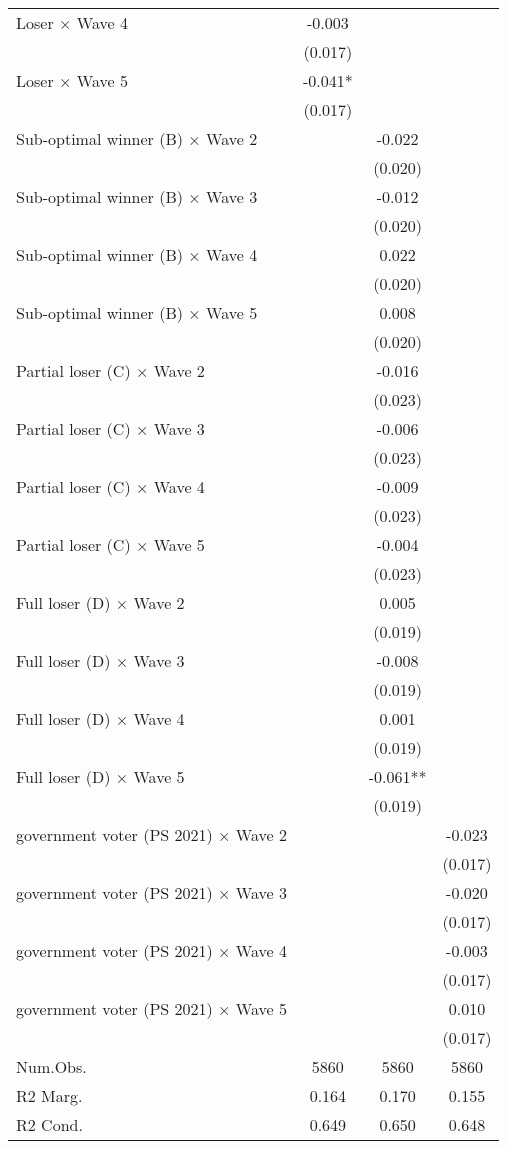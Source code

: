 \begin{tabular}[t]{lccc}
Loser × Wave 4 & -0.003 &  & \\
 & (0.017) &  \vphantom{1} & \\
Loser × Wave 5 & -0.041* &  & \\
 & (0.017) &  & \\
Sub-optimal winner (B) × Wave 2 &  & -0.022 & \\
 &  & (0.020) \vphantom{3} & \\
Sub-optimal winner (B) × Wave 3 &  & -0.012 & \\
 &  & (0.020) \vphantom{2} & \\
Sub-optimal winner (B) × Wave 4 &  & 0.022 & \\
 &  & (0.020) \vphantom{1} & \\
Sub-optimal winner (B) × Wave 5 &  & 0.008 & \\
 &  & (0.020) & \\
Partial loser (C) × Wave 2 &  & -0.016 & \\
 &  & (0.023) \vphantom{3} & \\
Partial loser (C) × Wave 3 &  & -0.006 & \\
 &  & (0.023) \vphantom{2} & \\
Partial loser (C) × Wave 4 &  & -0.009 & \\
 &  & (0.023) \vphantom{1} & \\
Partial loser (C) × Wave 5 &  & -0.004 & \\
 &  & (0.023) & \\
Full loser (D) × Wave 2 &  & 0.005 & \\
 &  & (0.019) \vphantom{3} & \\
Full loser (D) × Wave 3 &  & -0.008 & \\
 &  & (0.019) \vphantom{2} & \\
Full loser (D) × Wave 4 &  & 0.001 & \\
 &  & (0.019) \vphantom{1} & \\
Full loser (D) × Wave 5 &  & -0.061** & \\
 &  & (0.019) & \\
government voter (PS 2021) × Wave 2 &  &  & -0.023\\
 &  &  & \vphantom{3} (0.017)\\
government voter (PS 2021) × Wave 3 &  &  & -0.020\\
 &  &  & \vphantom{2} (0.017)\\
government voter (PS 2021) × Wave 4 &  &  & -0.003\\
 &  &  & \vphantom{1} (0.017)\\
government voter (PS 2021) × Wave 5 &  &  & 0.010\\
 &  &  & (0.017)\\
\midrule
Num.Obs. & 5860 & 5860 & 5860\\
R2 Marg. & 0.164 & 0.170 & 0.155\\
R2 Cond. & 0.649 & 0.650 & 0.648\\
\bottomrule
\end{tabular}
